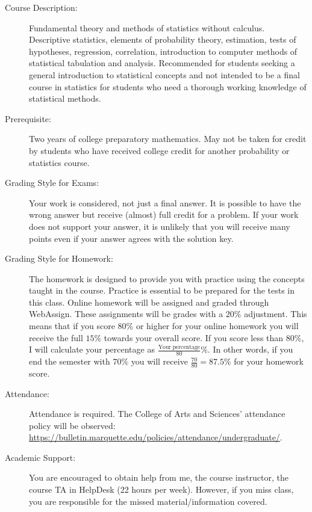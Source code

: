 \documentclass[10pt]{article}
\begin{document}
\begin{description}
\item[Course Description:] Fundamental theory and methods of statistics without calculus. Descriptive statistics, elements of probability theory, estimation, tests of hypotheses, regression, correlation, introduction to computer methods of statistical tabulation and analysis. Recommended for students seeking a general introduction to statistical concepts and not intended to be a final course in statistics for students who need a thorough working knowledge of statistical methods. 

\item[Prerequisite:] Two years of college preparatory mathematics. May not be taken for credit by students who have received college credit for another probability or statistics course.  

\item [Grading Style for Exams:] Your work is considered, not just a final answer. It is possible to have the wrong answer but receive (almost) full credit for a problem. If your work does not support your answer, it is unlikely that you will receive many points even if your answer agrees with the solution key.

\item [Grading Style for Homework:] The homework is designed to provide you with practice using the concepts taught in the course. Practice is essential to be prepared for the tests in this class. Online homework will be assigned and graded through WebAssign. These assignments will be grades with a $20\%$ adjustment. This means that if you score $80\%$ or higher for your online homework you will receive the full $15\%$ towards your overall score. If you score less than $80\%$, I will calculate your percentage as $\frac{\mathrm{Your\ percentage}}{80}\%$. In other words, if you end the semester with $70\%$ you will receive $\frac{70}{80}=87.5\%$ for your homework score.

\item [Attendance:] Attendance is required. The College of Arts and Sciences’ attendance policy will be observed: \url{https://bulletin.marquette.edu/policies/attendance/undergraduate/}.

\item [Academic Support:] You are encouraged to obtain help from me, the course instructor, the course TA in {\color{red} HelpDesk (22 hours per week)}. However, if you miss class, you are responsible for the missed material/information covered.\vspace{.1in}


\end{description}
\end{document}
